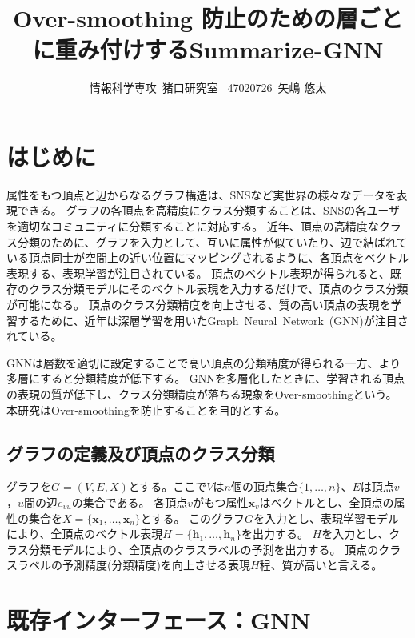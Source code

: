\documentclass[a4j,twocolumn]{jsarticle}
\title{Over-smoothing 防止のための層ごとに重み付けするSummarize-GNN}
\author{情報科学専攻~猪口研究室~
47020726~矢嶋 悠太 }
\date{}
\begin{document}
\maketitle

\section{はじめに}
\label{sec_introduction}
\vspace{-1mm}
属性をもつ頂点と辺からなるグラフ構造は、SNSなど実世界の様々なデータを表現できる。
グラフの各頂点を高精度にクラス分類することは、SNSの各ユーザを適切なコミュニティに分類することに対応する。
近年、頂点の高精度なクラス分類のために、グラフを入力として、互いに属性が似ていたり、辺で結ばれている頂点同士が空間上の近い位置にマッピングされるように、各頂点をベクトル表現する、表現学習が注目されている。
頂点のベクトル表現が得られると、既存のクラス分類モデルにそのベクトル表現を入力するだけで、頂点のクラス分類が可能になる。
頂点のクラス分類精度を向上させる、質の高い頂点の表現を学習するために、近年は深層学習を用いたGraph~Neural~Network~(GNN)\cite{Kipf}\cite{Velickovic}が注目されている。

GNNは層数を適切に設定することで高い頂点の分類精度が得られる一方、より多層にすると分類精度が低下する。
GNNを多層化したときに、学習される頂点の表現の質が低下し、クラス分類精度が落ちる現象をOver-smoothingという。
本研究はOver-smoothingを防止することを目的とする。


\vspace{+1mm}
\subsection*{グラフの定義及び頂点のクラス分類}

グラフを$G=(V,E,X)$とする。ここで$V$は$n$個の頂点集合$\{1,\ldots,n\}$、$E$は頂点$v$，$u$間の辺$e_{vu}$の集合である。
各頂点$v$がもつ属性$\bm{x}_v$はベクトルとし、全頂点の属性の集合を$X=\{ \bm{x}_1, \ldots, \bm{x}_n \}$とする。
このグラフ$G$を入力とし、表現学習モデルにより、全頂点のベクトル表現$H=\{\bm{h}_1, \ldots ,\bm{h}_n\}$を出力する。
$H$を入力とし、クラス分類モデルにより、全頂点のクラスラベルの予測を出力する。
頂点のクラスラベルの予測精度(分類精度)を向上させる表現$H$程、質が高いと言える。


\vspace{+2mm}
\section{既存インターフェース：GNN}
\label{sec_gnn}
\vspace{-1mm}
\end{document}
